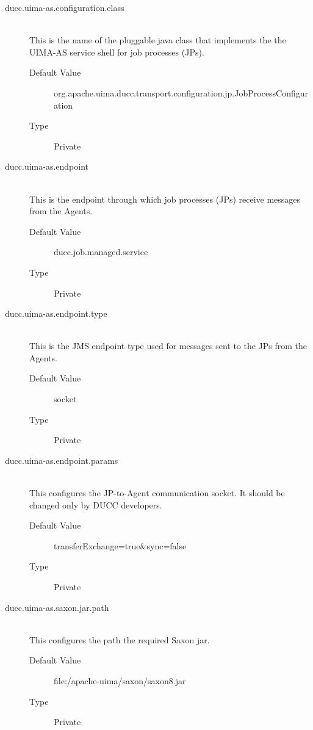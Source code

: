     \begin{description}

      \item[ducc.uima-as.configuration.class] \hfill \\
        This is the name of the pluggable java class that implements the the UIMA-AS service 
        shell for job processes (JPs). 
        \begin{description}
          \item[Default Value] org.apache.uima.ducc.transport.configuration.jp.JobProcessConfiguration
          \item[Type] Private 
        \end{description}
        
      \item[ducc.uima-as.endpoint] \hfill \\
        This is the endpoint through which job processes (JPs) receive messages from the Agents. 
        \begin{description}
          \item[Default Value] ducc.job.managed.service 
          \item[Type] Private 
        \end{description}
        
      \item[ducc.uima-as.endpoint.type] \hfill \\
        This is the JMS endpoint type used for messages sent to the JPs from the Agents. 
        \begin{description}
          \item[Default Value] socket 
          \item[Type] Private 
        \end{description}
        
      \item[ducc.uima-as.endpoint.params] \hfill \\
        This configures the JP-to-Agent communication socket. It should be changed only by 
        DUCC developers. 
        \begin{description}
          \item[Default Value] transferExchange=true\&sync=false 
          \item[Type] Private
        \end{description} 
        
      \item[ducc.uima-as.saxon.jar.path] \hfill \\
        This configures the path the required Saxon jar. 
        \begin{description}
          \item[Default Value] file:\ducchome/apache-uima/saxon/saxon8.jar
          \item[Type] Private 
        \end{description}
        


\end{description}
